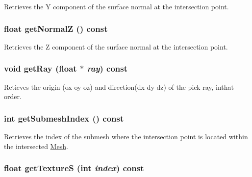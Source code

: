 Retrieves the Y component of the surface normal at the intersection point. \hypertarget{classm3g_1_1RayIntersection_5d0569741397401f53b776f16d08f5c3}{
\subsubsection[{getNormalZ}]{\setlength{\rightskip}{0pt plus 5cm}float getNormalZ () const}}
\label{classm3g_1_1RayIntersection_5d0569741397401f53b776f16d08f5c3}


Retrieves the Z component of the surface normal at the intersection point. \hypertarget{classm3g_1_1RayIntersection_3f4d1f2f24c0dadab914014836e1b138}{
\subsubsection[{getRay}]{\setlength{\rightskip}{0pt plus 5cm}void getRay (float $\ast$ {\em ray}) const}}
\label{classm3g_1_1RayIntersection_3f4d1f2f24c0dadab914014836e1b138}


Retieves the origin (ox oy oz) and direction(dx dy dz) of the pick ray, inthat order. \hypertarget{classm3g_1_1RayIntersection_6a11c61d1a1fecc01f2f83463404a6b8}{
\subsubsection[{getSubmeshIndex}]{\setlength{\rightskip}{0pt plus 5cm}int getSubmeshIndex () const}}
\label{classm3g_1_1RayIntersection_6a11c61d1a1fecc01f2f83463404a6b8}


Retrieves the index of the submesh where the intersection point is located within the intersected \hyperlink{classm3g_1_1Mesh}{Mesh}. \hypertarget{classm3g_1_1RayIntersection_bc14e1d5a83d5fca608b1fbf772614d4}{
\subsubsection[{getTextureS}]{\setlength{\rightskip}{0pt plus 5cm}float getTextureS (int {\em index}) const}}
\label{classm3g_1_1RayIntersection_bc14e1d5a83d5fca608b1fbf772614d4}


